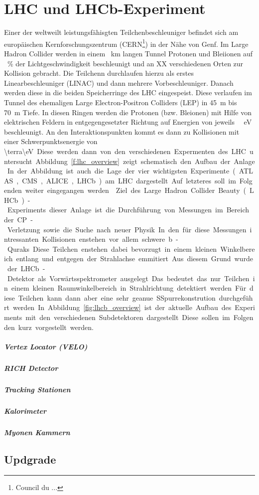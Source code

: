 \chapter{LHC und LHCb-Experiment}
Einer der weltweilt leistungsfähisgten Teilchenbeschleuniger befindet sich am
europäischen Kernforschungszentrum (CERN\footnote{Council du ...}) in der Nähe
von Genf. Im Large Hadron Collider werden in einem \SI{}{\kilo\meter} langen
Tunnel Protonen und Bleiionen auf \SI{}{\percent} der Lichtgeschwindigkeit
beschleunigt und an XX verschiedenen Orten zur Kollision gebracht. 
Die Teilchenn durchlaufen hierzu als erstes Linearbeschleuniger (LINAC) und
dann mehrere Vorbeschleuniger. Danach werden diese in die beiden Speicherringe
des LHC eingespeist. Diese verlaufen im Tunnel des ehemaligen Large
Electron-Positron Colliders (LEP) in \SI{45}{\meter} bis
\SI{70}{\meter}\cite{evans}
Tiefe. In diesen Ringen werden die Protonen (bzw. Bleionen) mit Hilfe von
elektrischen Feldern in entgegengesetzter Richtung  auf Energien von jeweils
\SI{}{\terra\eV} beschleunigt. An den Interaktionspunkten kommt es dann zu
Kollisionen mit einer Schwerpunktsenergie von \SI{\terra\eV}. Diese werden dann
von den verschiedenen Expermenten des LHC untersucht. Abbildung
\ref{f:lhc_overview} zeigt schematisch den Aufbau der Anlage. In der Abbildung
ist auch die Lage der vier wichtigsten Experimente (ATLAS, CMS, ALICE, LHCb) am
LHC dargestellt. Auf letzteres soll im Folgenden weiter eingegangen werden.
\noindent
Ziel des Large Hadron Collider Beauty (LHCb)-Experiments dieser Anlage ist die Durchführung
von Messungen im Bereich der CP-Verletzung sowie die Suche nach neuer Physik.
In den für diese Messungen intressanten Kollisionen enstehen vor allem schwere
b-Quraks. Diese Teilchen enstehen dabei bevorzugt in einem kleinen
Winkelbereich entlang und entgegen der Strahlachse emmitiert. Aus diesem Grund
wurde der LHCb-Detektor als Vorwärtsspektrometer ausgelegt. Das bedeutet das
nur Teilchen in einem kleinen Raumwinkelbereich in Strahlrichtung detektiert
werden. Für diese Teilchen kann dann aber eine sehr geanue SSpurrekonstrution
durchgeführt werden.
In Abbildung \ref{fig:lhcb_overview} ist der aktuelle Aufbau des Experiments mit den
verschiedenen Subdetektoren dargestellt. Diese sollen im Folgenden kurz
vorgestellt werden. 
\paragraph{Vertex Locator (VELO)}
\paragraph{RICH Detector}
\paragraph{Tracking Stationen}
\paragraph{Kalorimeter}
\paragraph{Myonen Kammern}
\section{Updgrade}



